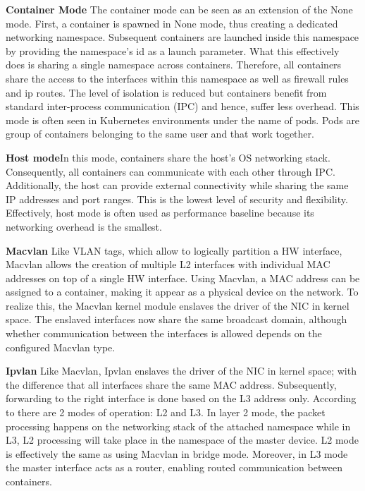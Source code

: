 \documentclass[conference]{IEEEtran}
\begin{document}
\noindent\textbf{Container Mode}\hspace{0.2cm} The container mode can be seen as an extension of the None mode. First, a container is spawned in None mode, thus creating a dedicated networking namespace. Subsequent containers are launched inside this namespace by providing the namespace's id as a launch parameter. What this effectively does is sharing a single namespace across containers. Therefore, all containers share the access to the interfaces within this namespace as well as firewall rules and ip routes. The level of isolation is reduced but containers benefit from standard inter-process communication (IPC) and hence, suffer less overhead. This mode is often seen in Kubernetes environments under the name of pods. Pods are group of containers belonging to the same user and that work together.

\noindent\textbf{Host mode}\hspace{0.2cm}In this mode, containers share the host's OS networking stack. Consequently, all containers can communicate with each other through IPC. Additionally, the host can provide external connectivity while sharing the same IP addresses and port ranges. This is the lowest level of security and flexibility. Effectively, host mode is often used as performance baseline because its networking overhead is the smallest.

\noindent\textbf{Macvlan}\hspace{0.2cm} Like VLAN tags, which allow to logically partition a HW interface, Macvlan allows the creation of multiple L2 interfaces with individual MAC addresses on top of a single HW interface. Using Macvlan, a MAC address can be assigned to a container, making it appear as a physical device on the network. To realize this, the Macvlan kernel module enslaves the driver of the NIC in kernel space. The enslaved interfaces now share the same broadcast domain, although whether communication between the interfaces is allowed depends on the configured Macvlan type.

\noindent\textbf{Ipvlan}\hspace{0.2cm}
Like Macvlan, Ipvlan enslaves the driver of the NIC in kernel space; with the difference that all interfaces share the same MAC address. Subsequently, forwarding to the right interface is done based on the L3 address only. According to \cite{ipvlan} there are 2 modes of operation: L2 and L3. In layer 2 mode, the packet processing happens on the networking stack of the attached namespace while in L3, L2 processing will take place in the namespace of the master device. L2 mode is effectively the same as using Macvlan in bridge mode. Moreover, in L3 mode the master interface acts as a router, enabling routed communication between containers. 
\end{document}
